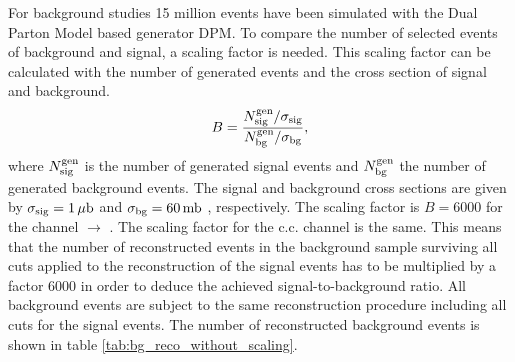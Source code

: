 For background studies 15 million events have been simulated with the Dual Parton Model based generator DPM.
To compare the number of selected events of background and signal, a scaling factor is needed.
This scaling factor can be calculated with the number of generated events and the cross section of signal and background.
\begin{equation}
		B = \frac{N^{\textnormal{gen}}_{\textnormal{sig}}/\sigma_{\textnormal{sig}}}{N^{\textnormal{gen}}_{\textnormal{bg}}/\sigma_{\textnormal{bg}}},
\label{eq:bg_scaling}
\end{equation}
where $N^{\textnormal{gen}}_{\textnormal{sig}}$ is the number of generated signal events and $N^{\textnormal{gen}}_{\textnormal{bg}}$ the number of generated background events.
The signal and background cross sections are given by $\sigma_{\textnormal{sig}} = 1\,\mu\textnormal{b}$\cite{PANDAphysics2009} and $\sigma_{\textnormal{bg}} = 60\, \textnormal{mb}$ \cite{PDG}, respectively.
The scaling factor is $B=6000$ for the channel \pbarp $\rightarrow$ \excitedcascade \anticascade.
The scaling factor for the c.c. channel is the same. 
This means that the number of reconstructed events in the background sample surviving all cuts applied to the reconstruction of the signal events 
has to be multiplied by a factor 6000 in order to deduce the achieved signal-to-background ratio. 
All background events are subject to the same reconstruction procedure including all cuts for the signal events. 
The number of reconstructed background events is shown in table \ref{tab:bg_reco_without_scaling}.

